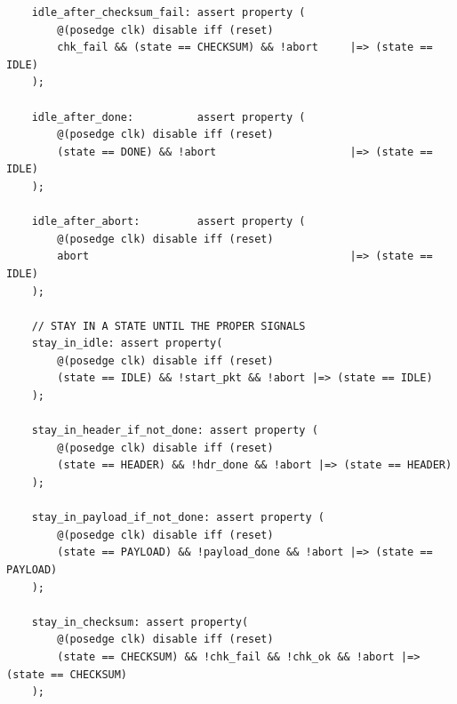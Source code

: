 \documentclass{article}
\begin{document}
\begin{verbatim}
    idle_after_checksum_fail: assert property (
        @(posedge clk) disable iff (reset) 
        chk_fail && (state == CHECKSUM) && !abort     |=> (state == IDLE)
    );

    idle_after_done:          assert property (
        @(posedge clk) disable iff (reset) 
        (state == DONE) && !abort                     |=> (state == IDLE)
    );

    idle_after_abort:         assert property (
        @(posedge clk) disable iff (reset) 
        abort                                         |=> (state == IDLE)
    );

    // STAY IN A STATE UNTIL THE PROPER SIGNALS
    stay_in_idle: assert property(
        @(posedge clk) disable iff (reset)
        (state == IDLE) && !start_pkt && !abort |=> (state == IDLE)
    );

    stay_in_header_if_not_done: assert property (
        @(posedge clk) disable iff (reset) 
        (state == HEADER) && !hdr_done && !abort |=> (state == HEADER)
    );

    stay_in_payload_if_not_done: assert property (
        @(posedge clk) disable iff (reset) 
        (state == PAYLOAD) && !payload_done && !abort |=> (state == PAYLOAD)
    );

    stay_in_checksum: assert property(
        @(posedge clk) disable iff (reset)
        (state == CHECKSUM) && !chk_fail && !chk_ok && !abort |=> (state == CHECKSUM)
    );
\end{verbatim}

\newpage
\end{document}
